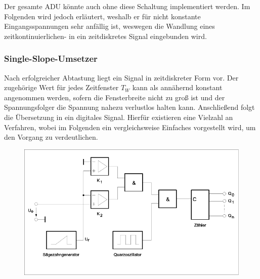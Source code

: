 Der gesamte ADU könnte auch ohne diese Schaltung implementiert werden. Im Folgenden wird jedoch erläutert, weshalb er für nicht konstante Eingangsspannungen sehr anfällig ist, weswegen die	Wandlung eines zeitkontinuierlichen- in ein zeitdiskretes Signal eingebunden wird.

\subsubsection{Single-Slope-Umsetzer}
\label{3.3.2}

Nach erfolgreicher Abtastung liegt ein Signal in zeitdiskreter Form vor. Der zugehörige Wert für jedes Zeitfenster $T_W$ kann als annähernd konstant angenommen werden, sofern die Fensterbreite nicht zu groß ist und der Spannungsfolger die Spannung nahezu verlustlos halten kann. Anschließend folgt die Übersetzung in ein digitales Signal. Hierfür existieren eine Vielzahl an Verfahren, wobei im Folgenden ein vergleichsweise Einfaches vorgestellt wird, um den Vorgang zu verdeutlichen.

\begin{figure}[h!]
\centering
\includegraphics[scale=0.4]{images/singleslope.png}
\label{singleslope_schaltung}
\end{figure}

